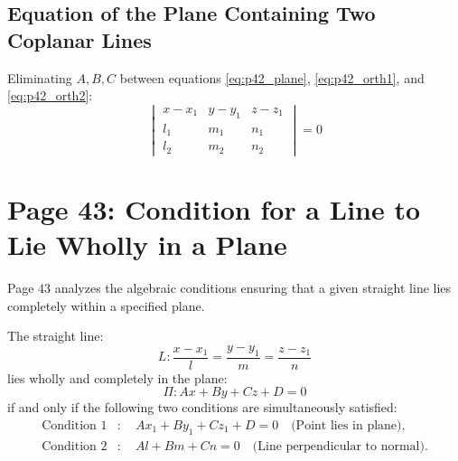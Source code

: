 \subsection{Equation of the Plane Containing Two Coplanar Lines}
Eliminating $A, B, C$ between equations \eqref{eq:p42_plane}, \eqref{eq:p42_orth1}, and \eqref{eq:p42_orth2}:
\begin{equation}
    \boxed{\begin{vmatrix}
    x - x_1 & y - y_1 & z - z_1 \\
    l_1 & m_1 & n_1 \\
    l_2 & m_2 & n_2
    \end{vmatrix} = 0}
\end{equation}

\section{Page 43: Condition for a Line to Lie Wholly in a Plane}
\label{sec:page43}

\begin{conceptbox}
Page 43 analyzes the algebraic conditions ensuring that a given straight line lies completely within a specified plane.
\end{conceptbox}

\begin{theorembox}
The straight line:
\begin{equation}
    L: \frac{x - x_1}{l} = \frac{y - y_1}{m} = \frac{z - z_1}{n}
\end{equation}
lies wholly and completely in the plane:
\begin{equation}
    \Pi: Ax + By + Cz + D = 0
\end{equation}
if and only if the following two conditions are simultaneously satisfied:
\begin{align}
    \text{Condition 1} &: \quad \boxed{Ax_1 + By_1 + Cz_1 + D = 0} \quad \text{(Point lies in plane)}, \\
    \text{Condition 2} &: \quad \boxed{Al + Bm + Cn = 0} \quad \text{(Line perpendicular to normal)}.
\end{align}
\end{theorembox}

